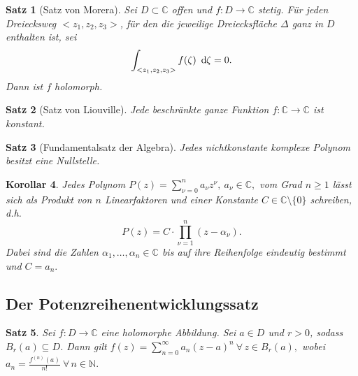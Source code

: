 \documentclass[a4paper,12pt]{article}
\theoremstyle{newthm}
\newtheorem{thm}{Satz}[subsection]
\newtheorem{cor}[thm]{Korollar}
\theoremstyle{newdef}
\theoremstyle{newrem}
\newcommand{\N}{\mathbb{N}}
\newcommand{\C}{\mathbb{C}}
\renewcommand{\d}{\ \operatorname{d}\hspace{-2px}}
\begin{document}
		\begin{thm}[Satz von Morera]
			Sei $ D \subset \C $ offen und $f: D \to \C$ stetig. Für jeden Dreiecksweg $ <z_1,z_2,z_3> $, für den die jeweilige Dreiecksfläche $\Delta$ ganz in $D$ enthalten ist, sei
			\[ \int_{<z_1,z_2,z_3>} f(\zeta) \d\zeta = 0. \]
			Dann ist $f$ holomorph.
		\end{thm}
		
		\begin{thm}[Satz von Liouville]
			Jede beschränkte ganze Funktion $f: \C \to \C$ ist konstant.
		\end{thm}
		
		\begin{thm}[Fundamentalsatz der Algebra]
			Jedes nichtkonstante komplexe Polynom besitzt eine Nullstelle.
		\end{thm}
	
		\begin{cor}
			Jedes Polynom $ P(z) = \sum_{\nu=0}^{n} a_\nu z^\nu,\ a_\nu \in \C, $ vom Grad $ n \geq 1 $ lässt sich als Produkt von $n$ Linearfaktoren und einer Konstante $ C \in \C \setminus \{0\} $ schreiben, d.h. 
			$$ P(z) = C \cdot \prod_{\nu = 1}^n (z-\alpha_\nu). $$
			Dabei sind die Zahlen $ \alpha_1,\dotsc,\alpha_n \in \C $ bis auf ihre Reihenfolge eindeutig bestimmt und $ C = a_n. $
		\end{cor}
	
	
	\subsection{Der Potenzreihenentwicklungssatz}
		
		\begin{thm}\label{2.4.1}
			Sei $ f: D \to \C $ eine holomorphe Abbildung. Sei $ a \in D $ und $r>0$, sodass $ B_r(a) \subseteq D $. Dann gilt $ f(z) = \sum_{n=0}^\infty a_n(z-a)^n\ \forall \, z \in B_r(a), $ wobei $ a_n = \frac{f^{(n)}(a)}{n!}\ \forall\, n \in \N. $
		\end{thm}
		
\end{document}

